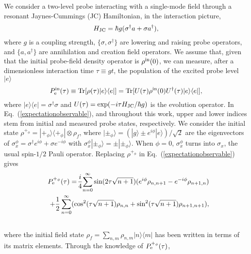 \documentclass[pra,aps,twocolumn,showpacs]{revtex4}
\begin{document}
We consider a two-level probe interacting with a single-mode field
through a resonant Jaynes-Cummings (JC) Hamiltonian, in the
interaction picture,
\begin{eqnarray}
\label{jaynescummings} H_{\rm JC} = \hbar g ( \sigma^{\dagger} a +
\sigma a^{\dagger} ) ,
\end{eqnarray}
where $g$ is a coupling strength, $\{ \sigma , \sigma^{\dagger}
\}$ are lowering and raising probe operators, and $\{ a ,
a^{\dagger} \}$ are annihilation and creation field operators. We
assume that, given that the initial probe-field density operator
is $\rho^{\rm in} (0)$, we can measure,  after a dimensionless
interaction time $\tau \equiv g t$, the population of the excited
probe level $| e \rangle$
\begin{eqnarray}
\label{expectationobservable}  P_{\rm e}^{\rm in} (\tau) \equiv
{\rm Tr} \lbrack \rho (\tau) | e \rangle \langle e | \rbrack =
{\rm Tr} \lbrack U (\tau) \rho^{\rm in} (0) U^{\dagger} (\tau) | e
\rangle \langle e | \rbrack ,
\end{eqnarray}
where  $| e \rangle \langle e | = \sigma^{\dagger} \sigma$ and $U
(\tau) = \exp ( -i \tau H_{\rm JC} / \hbar g )$ is the evolution
operator. In Eq.~(\ref{expectationobservable}), and throughout
this work, upper and lower indices stem from initial and measured
probe states, respectively. We consider the initial state
$\rho^{+_{\phi}} = | +_{\phi} \rangle \langle +_{\phi} | \otimes
\rho_{f}$, where $| \pm_{\phi} \rangle = ( | g \rangle \pm e^{i
\phi} | e \rangle ) / \sqrt{2}$ are the eigenvectors of
$\sigma^{\phi}_x = \sigma^{\dagger} e^{i \phi} + \sigma e^{-i
\phi}$ with $\sigma^{\phi}_x | \pm_{\phi} \rangle = \pm |
\pm_{\phi} \rangle$. When $\phi = 0$, $\sigma^{\phi}_x$ turns into
$\sigma_x$, the usual spin-$1/2$ Pauli operator. Replacing
$\rho^{+_{\phi}}$ in Eq.~(\ref{expectationobservable}) gives
\begin{eqnarray}
\label{probabilityprobe} && \!\!\!\!\!\!\!\! P_{\rm e}^{+_{\phi}}
(\tau) = \! \frac{i}{4} \! \sum^{\infty}_{n=0} \sin(2 \tau \sqrt{n
+ 1}) (e^{i\phi}\rho_{n , n+1} - e^{-i\phi} \rho_{n+1 , n})
\nonumber
\\ && + \frac{1}{2} \sum^{\infty}_{n=0}
(\cos^{2}(\tau \sqrt{n+1})\rho_{n,
 n} +  \sin^{2}(\tau \sqrt{n+1})\rho_{n+1 , n+1}) , \nonumber
\\ &&
\end{eqnarray}
where the initial field state $\rho_f = \sum_{n,m} \rho_{n,m} | n
\rangle \langle m |$ has been written in terms of its matrix
elements. Through the knowledge of $P_{\rm e}^{+_{\phi}} (\tau)$,
\end{document}
